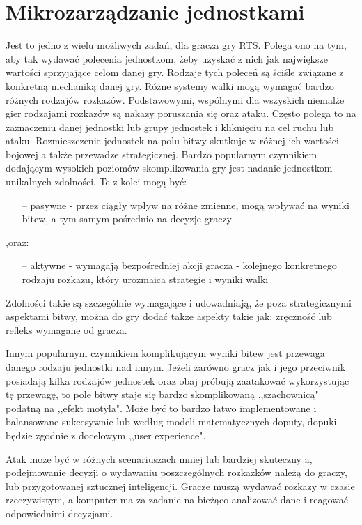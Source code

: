 \documentclass[12pt]{report}
\begin{document}
\section {Mikrozarządzanie jednostkami} 
Jest to jedno z wielu możliwych zadań, dla gracza gry RTS. Polega ono na tym, aby tak wydawać polecenia jednostkom, żeby uzyskać z nich jak największe wartości sprzyjające celom danej gry. Rodzaje tych poleceń są ściśle związane z konkretną mechaniką danej gry. Różne systemy walki mogą wymagać bardzo różnych rodzajów rozkazów. Podstawowymi, wspólnymi dla wszyskich niemalże gier rodzajami rozkazów są nakazy poruszania się oraz ataku. Często polega to na zaznaczeniu danej jednostki lub grupy jednostek i kliknięciu na cel ruchu lub ataku. Rozmieszczenie jednostek na polu bitwy skutkuje w różnej ich wartości bojowej a także przewadze strategicznej. Bardzo popularnym czynnikiem dodającym wysokich poziomów skomplikowania gry jest nadanie jednostkom unikalnych zdolności. Te z kolei mogą być: 

\begin{itemize}
\item[--] pasywne - przez ciągły wpływ na różne zmienne, mogą wpływać na wyniki bitew, a tym samym pośrednio na decyzje graczy
\end{itemize} 
,oraz:
\begin{itemize}
\item[--] aktywne - wymagają bezpośredniej akcji gracza - kolejnego konkretnego rodzaju rozkazu, który urozmaica strategie i wyniki walki 
\end{itemize} 

Zdolności takie są szczególnie wymagające i udowadniają, że poza strategicznymi aspektami bitwy, można do gry dodać także aspekty takie jak: zręczność lub refleks wymagane od gracza.

Innym popularnym czynnikiem komplikującym wyniki bitew jest przewaga danego rodzaju jednostki nad innym. Jeżeli zarówno gracz jak i jego przeciwnik posiadają kilka rodzajów jednostek oraz obaj próbują zaatakować wykorzystując tę przewagę, to pole bitwy staje się bardzo skomplikowaną ,,szachownicą" podatną na ,,efekt motyla". Może być to bardzo łatwo implementowane i balansowane sukcesywnie lub według modeli matematycznych doputy, dopuki będzie zgodnie z docelowym ,,user experience".

Atak może być w różnych scenariuszach mniej lub bardziej skuteczny a, podejmowanie decyzji o wydawaniu poszczególnych rozkazków należą do graczy, lub przygotowanej sztucznej inteligencji. Gracze muszą wydawać rozkazy w czasie rzeczywistym, a komputer ma za zadanie na bieżąco analizować dane i reagować odpowiednimi decyzjami.
\end{document}
